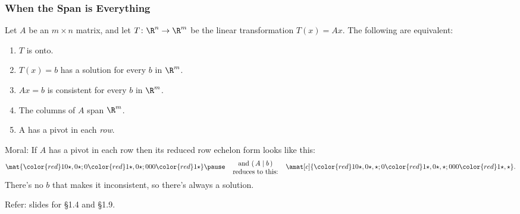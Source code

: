 \begin{frame}
\begin{uncoverenv}
\end{uncoverenv}

\end{frame}



\begin{frame}
\frametitle{When the Span is Everything}

\vskip-3mm

\begin{thm}
  Let $A$ be an $m\times n$ matrix, and let $T\colon\R^n\to\R^m$ be the linear
  transformation $T(x) = Ax$.  The following are equivalent:
  \begin{enumerate}
    \pause
  \item $T$ is onto.
    \pause
  \item $T(x) = b$ has a solution for every $b$ in $\R^m$.
    \pause
  \item $Ax = b$ is consistent for every $b$ in $\R^m$.
    \pause
  \item The columns of $A$ span $\R^m$.
    \pause
  \item A has a pivot in each \emph{row}.
  \end{enumerate}
\end{thm}

\pause
\alert{Moral:}
If $A$ has a pivot in each row then its reduced row echelon form looks like this:
\[\def\r{\color{red}} \mat{
\r1   0   \star,   0   \star ;
0   \r1   \star , 0   \star ;
0   0   0   \r1   \star 
}
\pause\quad\parbox{.2\textwidth}
{\centering and $(\,A\mid b\,)$ reduces to this:}\quad
\amat[c]{
\r1   0   \star,   0   \star, \star ;
0   \r1   \star , 0   \star, \star ;
0   0   0   \r1   \star, \star 
}.\]
\pause
There's no $b$ that makes it inconsistent, so there's always a solution.

\pause\medskip
\alert{Refer:} slides for \S1.4 and \S1.9.

\end{frame}


